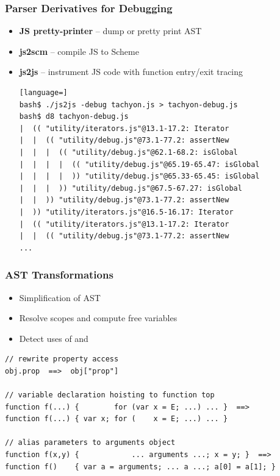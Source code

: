 \begin{frame}[fragile]
\frametitle{\bf Parser Derivatives for Debugging}

  \begin{itemize}

  \item {\bf JS pretty-printer} -- dump or pretty print AST
    \smallskip

  \item {\bf js2scm} -- compile JS to Scheme
    \smallskip

  \item {\bf js2js} -- instrument JS code with function entry/exit tracing
    \smallskip

\begin{lstlisting}[language=]
bash$ ./js2js -debug tachyon.js > tachyon-debug.js
bash$ d8 tachyon-debug.js
|  (( "utility/iterators.js"@13.1-17.2: Iterator
|  |  (( "utility/debug.js"@73.1-77.2: assertNew
|  |  |  (( "utility/debug.js"@62.1-68.2: isGlobal
|  |  |  |  (( "utility/debug.js"@65.19-65.47: isGlobal
|  |  |  |  )) "utility/debug.js"@65.33-65.45: isGlobal
|  |  |  )) "utility/debug.js"@67.5-67.27: isGlobal
|  |  )) "utility/debug.js"@73.1-77.2: assertNew
|  )) "utility/iterators.js"@16.5-16.17: Iterator
|  (( "utility/iterators.js"@13.1-17.2: Iterator
|  |  (( "utility/debug.js"@73.1-77.2: assertNew
...
\end{lstlisting}

  \end{itemize}

\end{frame}

\begin{frame}[fragile]
\frametitle{\bf AST Transformations}

  \begin{itemize}
  \item Simplification of AST
  \item Resolve scopes and compute free variables
  \item Detect uses of  and 
  \end{itemize}
  \bigskip

\begin{lstlisting}[keepspaces=true]
// rewrite property access
obj.prop  ==>  obj["prop"]

// variable declaration hoisting to function top
function f(...) {        for (var x = E; ...) ... }  ==>
function f(...) { var x; for (    x = E; ...) ... }

// alias parameters to arguments object
function f(x,y) {            ... arguments ...; x = y; }  ==>
function f()    { var a = arguments; ... a ...; a[0] = a[1]; }
\end{lstlisting}

\end{frame}
